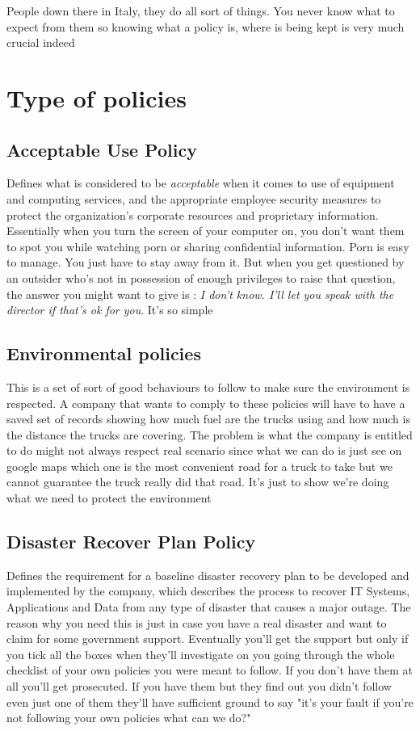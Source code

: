 \documentclass[a4paper,12pt]{article}
\begin{document}
People down there in Italy, they do all sort of things. You never know what to expect from them so knowing what a policy is, where is being kept is very much crucial indeed  


\section{Type of policies}
\subsection{Acceptable Use Policy}
Defines what is considered to be \emph{acceptable} when it comes to use of equipment and computing services, and the appropriate employee security measures to protect the organization’s corporate resources and proprietary information.
Essentially when you turn the screen of your computer on, you don't want them to spot you while watching porn or sharing confidential information. Porn is easy to manage. You just have to stay away from it. But when you get questioned by an outsider who's not in possession of enough privileges to raise that question, the answer you might want to give is : \emph{I don't know. I'll let you speak with the director if that's ok for you}. It's so simple

\subsection{Environmental policies}
This is a set of sort of good behaviours to follow to make sure the environment is respected. A company that wants to comply to these policies will have to have a saved set of records showing how much fuel are the trucks using and how much is the distance the trucks are covering. The problem is what the company is entitled to do might not always respect real scenario since what we can do is just see on google maps which one is the most convenient road for a truck to take but we cannot guarantee the truck really did that road. It's just to show we're doing what we need to protect the environment

\subsection{Disaster Recover Plan Policy}
Defines the requirement for a baseline disaster recovery plan to be developed and implemented by the company, which describes the process to recover IT Systems, Applications and Data from any type of disaster that causes a major outage. The reason why you need this is just in case you have a real disaster and want to claim for some government support. Eventually you'll get the support but only if you tick all the boxes when they'll investigate on you going through the whole checklist of your own policies you were meant to follow. If you don't have them at all you'll get prosecuted. If you have them but they find out you didn't follow even just one of them they'll have sufficient ground to say "it's your fault if you're not following your own policies what can we do?"
\end{document}
